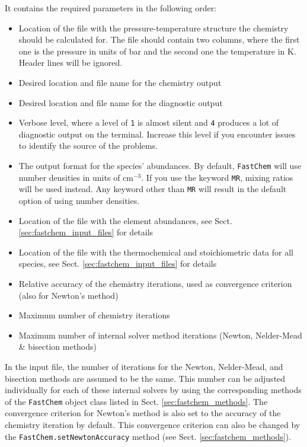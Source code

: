 \documentclass[numbers=noenddot]{aux/fcmanual}
\newcommand{\fc}{\texttt{FastChem}\xspace}
\begin{document}
It contains the required parameters in the following order:
\begin{itemize}
  \item Location of the file with the pressure-temperature structure the chemistry should be calculated for. The file should contain two columns, where the first one is the pressure in units of bar and the second one the temperature in K. Header lines will be ignored.
  \item Desired location and file name for the chemistry output
  \item Desired location and file name for the diagnostic output
  \item Verbose level, where a level of \verb|1| is almost silent and \verb|4| produces a lot of diagnostic output on the terminal. Increase this level if you encounter issues to identify the source of the problems.
  \item The output format for the species' abundances. By default, \fc will use number densities in units of cm$^{-3}$. If you use the keyword \verb|MR|, mixing ratios will be used instead. Any keyword other than \verb|MR| will result in the default option of using number densities.
  \item Location of the file with the element abundances, see Sect. \ref{sec:fastchem_input_files} for details
  \item Location of the file with the thermochemical and stoichiometric data for all species, see Sect. \ref{sec:fastchem_input_files} for details 
  \item Relative accuracy of the chemistry iterations, used as convergence criterion (also for Newton's method)
  \item Maximum number of chemistry iterations
  \item Maximum number of internal solver method iterations (Newton, Nelder-Mead \& bisection methods)
\end{itemize}

In the input file, the number of iterations for the Newton, Nelder-Mead, and bisection methods are assumed to be the same. This number can be adjusted individually for each of these internal solvers by using the corresponding methods of the \fc object class listed in Sect. \ref{sec:fastchem_methods}. The convergence criterion for Newton's method is also set to the accuracy of the chemistry iteration by default. This convergence criterion can also be changed by the \lstinline!FastChem.setNewtonAccuracy! method (see Sect. \ref{sec:fastchem_methods}).
\end{document}
